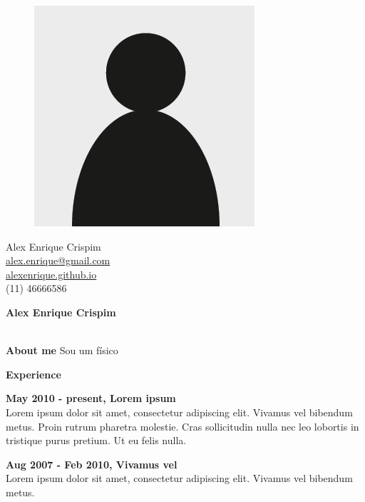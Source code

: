 \documentclass[a4paper,12pt,final]{memoir}
\newcommand{\Sep}{\vspace{1.5em}}
\newcommand{\SmallSep}{\vspace{0.5em}}
\newenvironment{AboutMe}
	{\ignorespaces\textbf{\color{RoyalBlue} About me}}
	{\Sep\ignorespacesafterend}
\newcommand{\CVSection}[1]
	{\Large\textbf{#1}\par
	\SmallSep\normalsize\normalfont}
\newcommand{\CVItem}[1]
	{\textbf{\color{RoyalBlue} #1}}
\begin{document}
\begin{figure}
	\hfill
	\includegraphics[width=0.6\columnwidth]{cv-photo.png}
	\vspace{-7cm}
\end{figure}

\begin{flushright}\small
	Alex Enrique Crispim\\ 
	\url{alex.enrique@gmail.com}  \\ 
	\url{alexenrique.github.io} \\ 
	(11) 46666586
\end{flushright}\normalsize
\framebreak



\Huge\bfseries {\color{RoyalBlue} Alex Enrique Crispim} \\ 
\Large\bfseries   \\ 

\normalsize\normalfont

\begin{AboutMe}
Sou um físico
\end{AboutMe}

\CVSection{Experience}
\CVItem{May 2010 - present, Lorem ipsum} \\ 
Lorem ipsum dolor sit amet, consectetur adipiscing elit. Vivamus vel bibendum metus. Proin rutrum pharetra molestie. Cras sollicitudin nulla nec leo lobortis in tristique purus pretium. Ut eu felis nulla.
\SmallSep

\CVItem{Aug 2007 - Feb 2010, Vivamus vel} \\ 
Lorem ipsum dolor sit amet, consectetur adipiscing elit. Vivamus vel bibendum metus.
\SmallSep
\end{document}
